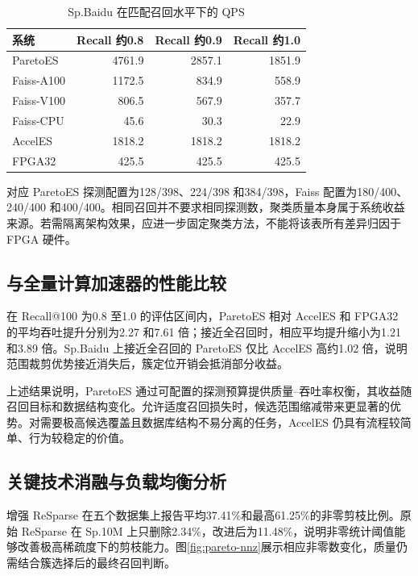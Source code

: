 
\begin{table}[htbp]\centering
\caption{Sp.Baidu 在匹配召回水平下的 QPS}\label{tab:pareto-qps}
\begin{tabular}{lrrr}\toprule
系统&Recall 约0.8&Recall 约0.9&Recall 约1.0\\\midrule
ParetoES&4761.9&2857.1&1851.9\\
Faiss-A100&1172.5&834.9&558.9\\
Faiss-V100&806.5&567.9&357.7\\
Faiss-CPU&45.6&30.3&22.9\\
AccelES&1818.2&1818.2&1818.2\\
FPGA32&425.5&425.5&425.5\\\bottomrule
\end{tabular}
\end{table}

对应 ParetoES 探测配置为128/398、224/398 和384/398，Faiss 配置为180/400、240/400 和400/400。相同召回并不要求相同探测数，聚类质量本身属于系统收益来源。若需隔离架构效果，应进一步固定聚类方法，不能将该表所有差异归因于 FPGA 硬件。

\subsection{与全量计算加速器的性能比较}
在 Recall@100 为0.8 至1.0 的评估区间内，ParetoES 相对 AccelES 和 FPGA32 的平均吞吐提升分别为2.27 和7.61 倍；接近全召回时，相应平均提升缩小为1.21 和3.89 倍。Sp.Baidu 上接近全召回的 ParetoES 仅比 AccelES 高约1.02 倍，说明范围裁剪优势接近消失后，簇定位开销会抵消部分收益。

上述结果说明，ParetoES 通过可配置的探测预算提供质量--吞吐率权衡，其收益随召回目标和数据结构变化。允许适度召回损失时，候选范围缩减带来更显著的优势。对需要极高候选覆盖且数据库结构不易分离的任务，AccelES 仍具有流程较简单、行为较稳定的价值。

\subsection{关键技术消融与负载均衡分析}
增强 ReSparse 在五个数据集上报告平均37.41\%和最高61.25\%的非零剪枝比例。原始 ReSparse 在 Sp.10M 上只删除2.34\%，改进后为11.48\%，说明非零统计阈值能够改善极高稀疏度下的剪枝能力。图\ref{fig:pareto-nnz}展示相应非零数变化，质量仍需结合簇选择后的最终召回判断。


